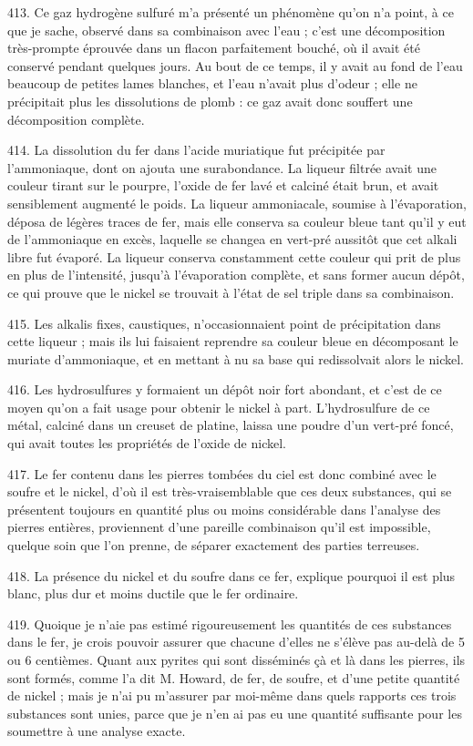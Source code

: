 \documentclass[a4paper, 11pt, oneside, polutonikogreek, french]{article}
\begin{document}
413. Ce gaz hydrogène sulfuré m'a présenté un phénomène qu'on n'a point, à ce que je sache, observé dans sa combinaison avec l'eau ; c'est une décomposition très-prompte éprouvée dans un flacon parfaitement bouché, où il avait été conservé pendant quelques jours. Au bout de ce temps, il y avait au fond de l'eau beaucoup de petites lames blanches, et l'eau n'avait plus d'odeur ; elle ne précipitait plus les dissolutions de plomb : ce gaz avait donc souffert une décomposition complète.

414. La dissolution du fer dans l'acide muriatique fut précipitée par l'ammoniaque, dont on ajouta une surabondance. La liqueur filtrée avait une couleur tirant sur le pourpre, l'oxide de fer lavé et calciné était brun, et avait sensiblement augmenté le poids. La liqueur ammoniacale, soumise à l'évaporation, déposa de légères traces de fer, mais elle conserva sa couleur bleue tant qu'il y eut de l'ammoniaque en excès, laquelle se changea en vert-pré aussitôt que cet alkali libre fut évaporé. La liqueur conserva constamment cette couleur qui prit de plus en plus de l'intensité, jusqu'à l'évaporation complète, et sans former aucun dépôt, ce qui prouve que le nickel se trouvait à l'état de sel triple dans sa combinaison.

415. Les alkalis fixes, caustiques, n'occasionnaient point de précipitation dans cette liqueur ; mais ils lui faisaient reprendre sa couleur bleue en décomposant le muriate d'ammoniaque, et en mettant à nu sa base qui redissolvait alors le nickel.

416. Les hydrosulfures y formaient un dépôt noir fort abondant, et c'est de ce moyen qu'on a fait usage pour obtenir le nickel à part. L'hydrosulfure de ce métal, calciné dans un creuset de platine, laissa une poudre d'un vert-pré foncé, qui avait toutes les propriétés de l'oxide de nickel.

417. Le fer contenu dans les pierres tombées du ciel est donc combiné avec le soufre et le nickel, d'où il est très-vraisemblable que ces deux substances, qui se présentent toujours en quantité plus ou moins considérable dans l'analyse des pierres entières, proviennent d'une pareille combinaison qu'il est impossible, quelque soin que l'on prenne, de séparer exactement des parties terreuses.

418. La présence du nickel et du soufre dans ce fer, explique pourquoi il est plus blanc, plus dur et moins ductile que le fer ordinaire.

419. Quoique je n'aie pas estimé rigoureusement les quantités de ces substances dans le fer, je crois pouvoir assurer que chacune d'elles ne s'élève pas au-delà de 5 ou 6 centièmes. Quant aux pyrites qui sont disséminés çà et là dans les pierres, ils sont formés, comme l'a dit M. Howard, de fer, de soufre, et d'une petite quantité de nickel ; mais je n'ai pu m'assurer par moi-même dans quels rapports ces trois substances sont unies, parce que je n'en ai pas eu une quantité suffisante pour les soumettre à une analyse exacte.
\end{document}
